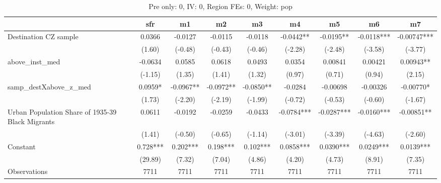 \begin{table}[htbp]\centering
\def\sym#1{\ifmmode^{#1}\else\(^{#1}\)\fi}
\caption{Pre only: 0, IV: 0, Region FEs: 0, Weight: pop}
\begin{tabular}{l*{8}{c}}
\toprule
                    &\multicolumn{1}{c}{sfr}&\multicolumn{1}{c}{m1}&\multicolumn{1}{c}{m2}&\multicolumn{1}{c}{m3}&\multicolumn{1}{c}{m4}&\multicolumn{1}{c}{m5}&\multicolumn{1}{c}{m6}&\multicolumn{1}{c}{m7}\\
\midrule
Destination CZ sample&      0.0366   &     -0.0127   &     -0.0115   &     -0.0118   &     -0.0442** &     -0.0195** &     -0.0118***&    -0.00747***\\
                    &      (1.60)   &     (-0.48)   &     (-0.43)   &     (-0.46)   &     (-2.28)   &     (-2.48)   &     (-3.58)   &     (-3.77)   \\
\addlinespace
above\_inst\_med      &     -0.0634   &      0.0585   &      0.0618   &      0.0493   &      0.0354   &     0.00841   &     0.00421   &     0.00943** \\
                    &     (-1.15)   &      (1.35)   &      (1.41)   &      (1.32)   &      (0.97)   &      (0.71)   &      (0.94)   &      (2.15)   \\
\addlinespace
samp\_destXabove\_z\_med&      0.0959*  &     -0.0967** &     -0.0972** &     -0.0850** &     -0.0284   &    -0.00698   &    -0.00326   &    -0.00770*  \\
                    &      (1.73)   &     (-2.20)   &     (-2.19)   &     (-1.99)   &     (-0.72)   &     (-0.53)   &     (-0.60)   &     (-1.67)   \\
\addlinespace
Urban Population Share of 1935-39 Black Migrants&      0.0611   &     -0.0192   &     -0.0259   &     -0.0433   &     -0.0784***&     -0.0287***&     -0.0160***&    -0.00851** \\
                    &      (1.41)   &     (-0.50)   &     (-0.65)   &     (-1.14)   &     (-3.01)   &     (-3.39)   &     (-4.63)   &     (-2.60)   \\
\addlinespace
Constant            &       0.728***&       0.202***&       0.198***&       0.102***&      0.0858***&      0.0390***&      0.0249***&      0.0139***\\
                    &     (29.89)   &      (7.32)   &      (7.04)   &      (4.86)   &      (4.20)   &      (4.73)   &      (8.91)   &      (7.35)   \\
\midrule
Observations        &        7711   &        7711   &        7711   &        7711   &        7711   &        7711   &        7711   &        7711   \\

\end{tabular}
\end{table}
